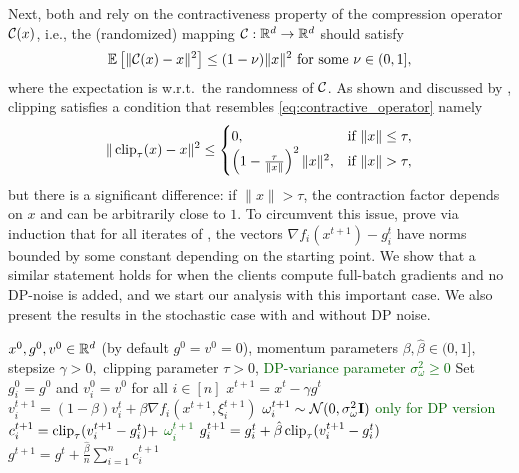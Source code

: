 \documentclass[a4paper,11pt]{article}
\begin{document}
Next, both  and  rely on the contractiveness property of the compression operator $\mathcal{C}(x)$, i.e., the (randomized) mapping $\mathcal{C}:\mathbb{R}^d \to \mathbb{R}^d$ should satisfy
\begin{equation}
    \mathbb{E}\left[\|\mathcal{C}(x) - x\|^2\right] \leq (1 - \nu)\|x\|^2 \text{ for some } \nu \in (0,1], \label{eq:contractive_operator}
\end{equation}
where the expectation is w.r.t.\ the randomness of $\mathcal{C}$. As shown and discussed by \citet{khirirat2023clip21},  clipping satisfies a condition that resembles \eqref{eq:contractive_operator} namely
\begin{equation}
    \|\operatorname{clip}_\tau(x) - x\|^2 \leq \begin{cases}
        0,& \text{if } \|x\| \leq \tau,\\ \left(1 - \frac{\tau}{\|x\|}\right)^2\|x\|^2,& \text{if } \|x\| > \tau,
    \end{cases} \label{eq:clipping_contraction}
\end{equation}
but there is a significant difference: if $\|x\| > \tau$, the contraction factor depends on $x$ and can be arbitrarily close to $1$. To circumvent this issue, \citet{khirirat2023clip21} prove via induction that for all iterates of , the vectors $\nabla f_i(x^{t+1}) - g_i^t$ have norms bounded by some constant depending on the starting point. We show that a similar statement holds for  when the clients compute full-batch gradients and no DP-noise is added, and we start our analysis with this important case. We also present the results in the stochastic case with and without DP noise. 

\begin{algorithm}[t]
\caption{ }
\label{alg:Clip-SGDM}
\begin{algorithmic}[1]
\Require $x^0, g^0, v^0 \in \mathbb{R}^d$ (by default $g^0 = v^0 = 0$), momentum parameters $\beta, \hat\beta\in(0,1],$ stepsize $\gamma > 0,$ clipping parameter $\tau > 0$, \textcolor{darkgreen}{DP-variance parameter $\sigma^2_{\omega} \ge 0$} 
    \State Set $g_i^0 = g^0$ and $v_i^0 = v^0$ for all $i\in [n]$
        \State $x^{t+1} = x^t - \gamma g^t$
            \State $v_i^{t+1} = (1-\beta)v_i^t + \beta\nabla f_i(x^{t+1},\xi^{t+1}_i)$
            \State \textcolor{darkgreen}{$\omega_i^{t+1} \sim \mathcal N(0,\sigma^2_{\omega}\mathbf{I})$} \hfill{\small \textcolor{darkgreen}{only for DP version}}
            \State $c_i^{t+1} = \operatorname{clip}_{\tau}(v_i^{t+1} - g_i^t) +$ \textcolor{darkgreen}{$\omega_i^{t+1}$}
            \State %
            $g_i^{t+1} = g_i^t + \hat\beta\operatorname{clip}_{\tau}(v_i^{t+1} - g_i^t)$
        \EndFor
        \State $g^{t+1} = g^t + \frac{\hat\beta}{n}\sum_{i=1}^nc_i^{t+1}$
    \EndFor
\end{algorithmic}	
\end{algorithm}
\end{document}
